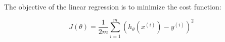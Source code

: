 \documentclass{article}
\begin{document}
{\Large



The objective of the linear regression is to minimize the cost function:

\begin{equation}
 J(\theta) = \frac{1}{2m} \sum_{i=1}^m ( h_\theta (x^{(i)}) - y^{(i)} ) ^2 
\end{equation}

}
\end{document}
